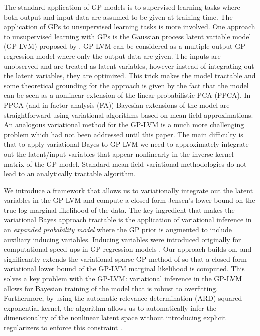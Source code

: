 \documentclass[twoside,times]{article}
\begin{document}
The standard application of GP models is to supervised learning tasks
where both output and input data are assumed to be given at
training time. The application of GPs to unsupervised learning tasks
is more involved. One approach to unsupervised learning with GPs 
is the Gaussian process latent variable model (GP-LVM) proposed by
\cite{Lawrence:gplvm03,Lawrence:pnpca05}. GP-LVM can be considered as
a multiple-output GP regression model where only the output data are
given. The inputs are unobserved and are treated as latent
variables, however instead of integrating out the latent variables,
they are optimized. This trick makes the model tractable and some
theoretical grounding for the approach is given by the fact that the
model can be seen as a nonlinear extension of the linear
probabilistic PCA (PPCA). In PPCA (and in factor analysis (FA))
Bayesian extensions of the model are straightforward
\citep{Bishop:icann99,Ghahramani:bfa00} using variational algorithms
based on mean field approximations. An analogous variational method
for the GP-LVM is a much more challenging problem which had not been
addressed until this paper.  The main difficulty is that  to
apply variational Bayes to GP-LVM we need to approximately integrate
out the latent/input variables that appear nonlinearly in the inverse
kernel matrix of the GP model. Standard mean field variational
methodologies do not lead to an analytically tractable algorithm.

We introduce a framework that allows us to variationally
integrate out the latent variables in the GP-LVM and compute a
closed-form Jensen's lower bound on the true log marginal likelihood
of the data.  The key ingredient that makes the variational Bayes
approach tractable is the application of variational inference in an
\emph{expanded probability model} where the GP prior 
is augmented to include auxiliary inducing
variables. Inducing variables were introduced originally for
computational speed ups in GP regression models
\citep{Csato:sparse02,Seeger:fast03,Csato:thesis02,Snelson:pseudo05,Quinonero:unifying05,Titsias:variational09}. Our
approach builds on, and significantly extends the variational sparse
GP method of \citet{Titsias:variational09} so that a closed-form
variational lower bound of the GP-LVM marginal likelihood is
computed. This solves a key problem with the GP-LVM:  variational
inference in the GP-LVM allows for Bayesian training 
of the model that is robust to overfitting. Furthermore, by
using the automatic relevance determination (ARD) squared exponential
kernel, the algorithm allows us to automatically infer the dimensionality
of the nonlinear latent space without introducing explicit
regularizers to enforce this constraint \citep{Geiger:rank09}.
\end{document}
